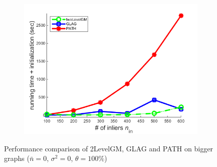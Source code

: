 \begin{figure}[h]
\begin{subfigure}[b]{0.32\textwidth}
			\includegraphics[scale=0.33]{"chapter3/fig/SyntheticTest_BigGraphs/descr/Results_v4.3.3/Test1/time_summary_avg1t"} 
		\end{subfigure} 	
	\caption[Performance comparison of 2LevelGM, GLAG and PATH on bigger graphs: test $1$]{Performance comparison of 2LevelGM, GLAG and PATH on bigger graphs ($\bar{n}=0$, $\sigma^2=0$, $\theta=100\%$)}
	\label{fig:synTest1_bigGraphs_ver433}
\end{figure}
